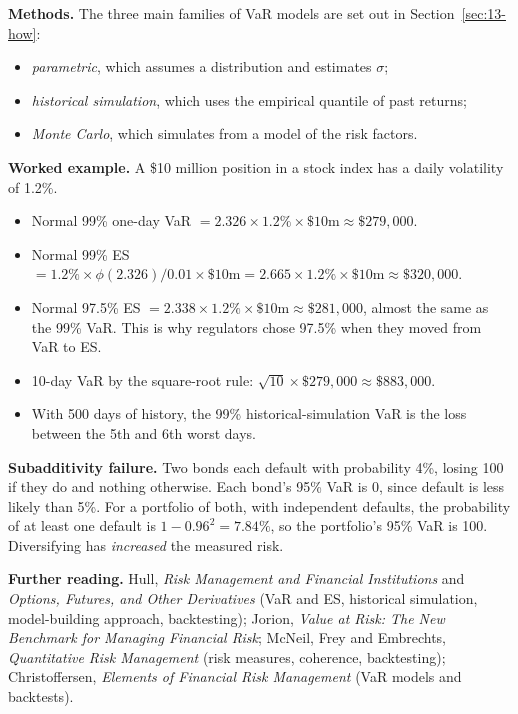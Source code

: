 \textbf{Methods.} The three main families of VaR models are set out in Section~\ref{sec:13-how}:

\begin{itemize}
  \item \emph{parametric}, which assumes a distribution and estimates $\sigma$;
  \item \emph{historical simulation}, which uses the empirical quantile of past returns;
  \item \emph{Monte Carlo}, which simulates from a model of the risk factors.
\end{itemize}

\textbf{Worked example.} A \$10 million position in a stock index has a daily volatility of 1.2\%.

\begin{itemize}
  \item Normal 99\% one-day VaR $= 2.326 \times 1.2\% \times \$10\text{m} \approx \$279{,}000$.
  \item Normal 99\% ES $= 1.2\% \times \phi(2.326)/0.01 \times \$10\text{m} = 2.665 \times 1.2\% \times \$10\text{m} \approx \$320{,}000$.
  \item Normal 97.5\% ES $= 2.338 \times 1.2\% \times \$10\text{m} \approx \$281{,}000$, almost the same as the 99\% VaR. This is why regulators chose 97.5\% when they moved from VaR to ES.
  \item 10-day VaR by the square-root rule: $\sqrt{10} \times \$279{,}000 \approx \$883{,}000$.
  \item With 500 days of history, the 99\% historical-simulation VaR is the loss between the 5th and 6th worst days.
\end{itemize}

\textbf{Subadditivity failure.} Two bonds each default with probability 4\%, losing 100 if they do and nothing otherwise. Each bond's 95\% VaR is 0, since default is less likely than 5\%. For a portfolio of both, with independent defaults, the probability of at least one default is $1 - 0.96^2 = 7.84\%$, so the portfolio's 95\% VaR is 100. Diversifying has \emph{increased} the measured risk.

\textbf{Further reading.} Hull, \emph{Risk Management and Financial Institutions} and \emph{Options, Futures, and Other Derivatives} (VaR and ES, historical simulation, model-building approach, backtesting); Jorion, \emph{Value at Risk: The New Benchmark for Managing Financial Risk}; McNeil, Frey and Embrechts, \emph{Quantitative Risk Management} (risk measures, coherence, backtesting); Christoffersen, \emph{Elements of Financial Risk Management} (VaR models and backtests).

